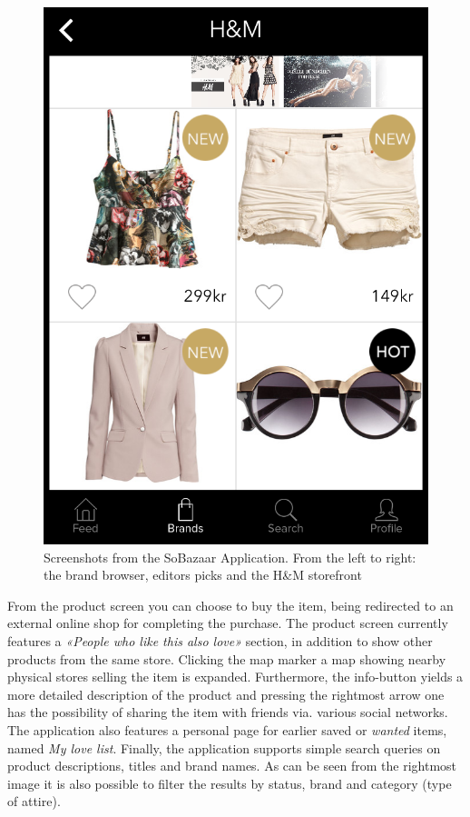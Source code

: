 \begin{figure}[H]
\begin{minipage}{.3\linewidth}
      \includegraphics[height=1.5\linewidth]{image/SoBazaarStore.png}
  \end{minipage}
  \caption[SoBazaar storefront screenshots - version 0.5.1]{Screenshots from the SoBazaar Application. From the left to right: the brand browser, editors picks and the H\&M storefront}
  \label{figure:SoBazaarfeed}
\end{figure}

From the product screen you can choose to buy the item, being redirected to an
external online shop for completing the purchase. The product screen currently
features a \emph{«People who like this also love»} section, in addition to show
other products from the same store. Clicking the map marker a map showing
nearby physical stores selling the item is expanded. Furthermore, the
info-button yields a more detailed description of the product and pressing the
rightmost arrow one has the possibility of sharing the item with friends via.
various social networks. The application also features a personal page for
earlier saved or \emph{wanted} items, named \textit{My love list}. Finally, the
application supports simple search queries on product descriptions, titles and
brand names. As can be seen from the rightmost image it is also possible to
filter the results by status, brand and category (type of attire).

